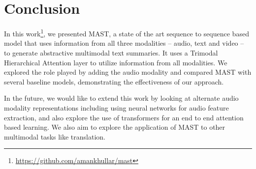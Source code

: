 \documentclass[11pt,a4paper]{article}
\begin{document}
\section{Conclusion}
In this work\footnote{\url{https://github.com/amankhullar/mast}}, we presented MAST, a state of the art sequence to sequence based model that uses information from all three modalities -- audio, text and video -- to generate abstractive multimodal text summaries. It uses a Trimodal Hierarchical Attention layer to utilize information from all modalities. We explored the role played by adding the audio modality and compared MAST with several baseline models, demonstrating the effectiveness of our approach.

In the future, we would like to extend this work by looking at alternate audio modality representations including using neural networks for audio feature extraction, and also explore the use of transformers for an end to end attention based learning. We also aim to explore the application of MAST to other multimodal tasks like translation.







\end{document}
